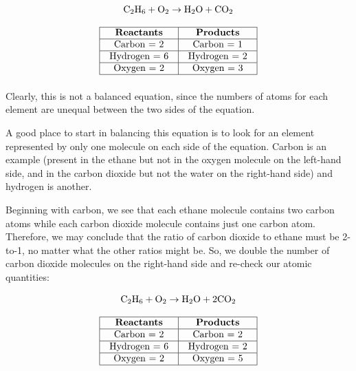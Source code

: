$$\hbox{C}_2\hbox{H}_6 + \hbox{O}_2 \to \hbox{H}_2\hbox{O} + \hbox{CO}_2$$


$$\vbox{\offinterlineskip
\halign{\strut
\vrule \quad\hfil # \ \hfil & 
\vrule \quad\hfil # \ \hfil \vrule \cr
\noalign{\hrule}
%
\textbf{Reactants} & \textbf{Products} \cr
%
\noalign{\hrule}
%
Carbon = 2 & Carbon = 1 \cr
%
\noalign{\hrule}
%
Hydrogen = 6 & Hydrogen = 2 \cr
%
\noalign{\hrule}
%
Oxygen = 2 & Oxygen = 3 \cr
%
\noalign{\hrule}
} %
}$$ %

Clearly, this is not a balanced equation, since the numbers of atoms for each element are unequal between the two sides of the equation.

\vskip 10pt

A good place to start in balancing this equation is to look for an element represented by only one molecule on each side of the equation.  Carbon is an example (present in the ethane but not in the oxygen molecule on the left-hand side, and in the carbon dioxide but not the water on the right-hand side) and hydrogen is another.  

\filbreak

Beginning with carbon, we see that each ethane molecule contains two carbon atoms while each carbon dioxide molecule contains just one carbon atom.  Therefore, we may conclude that the ratio of carbon dioxide to ethane must be 2-to-1, no matter what the other ratios might be.  So, we double the number of carbon dioxide molecules on the right-hand side and re-check our atomic quantities:

$$\hbox{C}_2\hbox{H}_6 + \hbox{O}_2 \to \hbox{H}_2\hbox{O} + \hbox{2CO}_2$$


$$\vbox{\offinterlineskip
\halign{\strut
\vrule \quad\hfil # \ \hfil & 
\vrule \quad\hfil # \ \hfil \vrule \cr
\noalign{\hrule}
%
\textbf{Reactants} & \textbf{Products} \cr
%
\noalign{\hrule}
%
Carbon = 2 & Carbon = 2 \cr
%
\noalign{\hrule}
%
Hydrogen = 6 & Hydrogen = 2 \cr
%
\noalign{\hrule}
%
Oxygen = 2 & Oxygen = 5 \cr
%
\noalign{\hrule}
} %
}$$ %

\vskip 10pt

